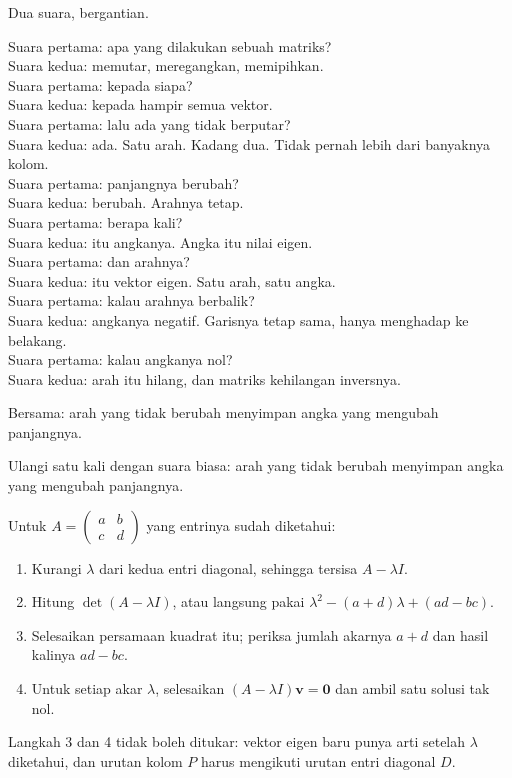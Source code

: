 \begin{bacakeras}
Dua suara, bergantian.

Suara pertama: apa yang dilakukan sebuah matriks?\\
Suara kedua: memutar, meregangkan, memipihkan.\\
Suara pertama: kepada siapa?\\
Suara kedua: kepada hampir semua vektor.\\
Suara pertama: lalu ada yang tidak berputar?\\
Suara kedua: ada. Satu arah. Kadang dua. Tidak pernah lebih dari banyaknya kolom.\\
Suara pertama: panjangnya berubah?\\
Suara kedua: berubah. Arahnya tetap.\\
Suara pertama: berapa kali?\\
Suara kedua: itu angkanya. Angka itu nilai eigen.\\
Suara pertama: dan arahnya?\\
Suara kedua: itu vektor eigen. Satu arah, satu angka.\\
Suara pertama: kalau arahnya berbalik?\\
Suara kedua: angkanya negatif. Garisnya tetap sama, hanya menghadap ke belakang.\\
Suara pertama: kalau angkanya nol?\\
Suara kedua: arah itu hilang, dan matriks kehilangan inversnya.

Bersama: arah yang tidak berubah menyimpan angka yang mengubah panjangnya.

Ulangi satu kali dengan suara biasa: arah yang tidak berubah menyimpan angka yang mengubah panjangnya.
\end{bacakeras}

\begin{resep}
Untuk $A=\begin{pmatrix}a&b\\c&d\end{pmatrix}$ yang entrinya sudah diketahui:
\begin{enumerate}
  \item Kurangi $\lambda$ dari kedua entri diagonal, sehingga tersisa $A-\lambda I$.
  \item Hitung $\det(A-\lambda I)$, atau langsung pakai $\lambda^{2}-(a+d)\lambda+(ad-bc)$.
  \item Selesaikan persamaan kuadrat itu; periksa jumlah akarnya $a+d$ dan hasil kalinya $ad-bc$.
  \item Untuk setiap akar $\lambda$, selesaikan $(A-\lambda I)\mathbf{v}=\mathbf{0}$ dan ambil satu
        solusi tak nol.
\end{enumerate}
Langkah 3 dan 4 tidak boleh ditukar: vektor eigen baru punya arti setelah $\lambda$ diketahui, dan
urutan kolom $P$ harus mengikuti urutan entri diagonal $D$.
\end{resep}


